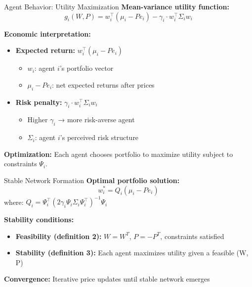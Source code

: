 \documentclass[aspectratio=169]{beamer}
\begin{document}
\begin{frame}{Agent Behavior: Utility Maximization}
\textbf{Mean-variance utility function:}
\begin{equation}
g_i(W,P) = w_i^\top (\mu_i - P e_i) - \gamma_i \cdot w_i^\top \Sigma_i w_i
\end{equation}

\vspace{0.3cm}
\textbf{Economic interpretation:}
\begin{itemize}
    \item \textbf{Expected return:} $w_i^\top (\mu_i - P e_i)$
    \begin{itemize}
        \item $w_i$: agent $i$'s portfolio vector
        \item $\mu_i - P e_i$: net expected returns after prices
    \end{itemize}
    
    \item \textbf{Risk penalty:} $\gamma_i \cdot w_i^\top \Sigma_i w_i$
    \begin{itemize}
        \item Higher $\gamma_i$ → more risk-averse agent
        \item $\Sigma_i$: agent $i$'s perceived risk structure
    \end{itemize}
\end{itemize}

\vspace{0.3cm}
\textbf{Optimization:} Each agent chooses portfolio to maximize utility subject to constraints $\Psi_i$.
\end{frame}

\begin{frame}{Stable Network Formation}
\textbf{Optimal portfolio solution:}
$$w_i^* = Q_i(\mu_i - Pe_i)$$
where: $Q_i = \Psi_i^\top(2\gamma_i\Psi_i\Sigma_i\Psi_i^\top)^{-1}\Psi_i$

\vspace{0.3cm}
\textbf{Stability conditions:}
\begin{itemize}
    \item \textbf{Feasibility (definition 2):} $W = W^T$, $P = -P^T$, constraints satisfied
    \item \textbf{Stability (definition 3):} Each agent maximizes utility given a feasible (W, P)
\end{itemize}

\vspace{0.3cm}
\textbf{Convergence:} Iterative price updates until stable network emerges
\end{frame}
\end{document}
